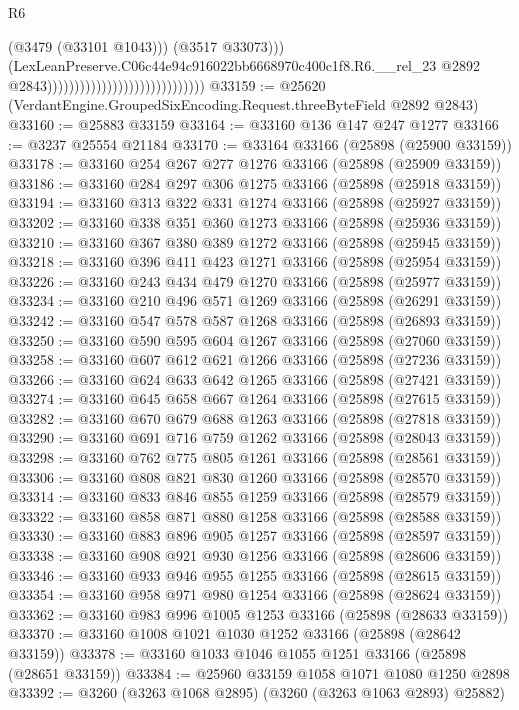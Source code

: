 \begin{lexlean}{R6}
\begin{coremodule}
                                                                  (@3479 (@33101 @1043)))
                                                                (@3517 @33073)))
                                                            (LexLeanPreserve.C06c44e94c916022bb6668970c400c1f8.R6.__rel_23
                                                              @2892
                                                              @2843)))))))))))))))))))))))))))))
@33159 := @25620 (VerdantEngine.GroupedSixEncoding.Request.threeByteField @2892 @2843)
@33160 := @25883 @33159
@33164 := @33160 @136 @147 @247 @1277
@33166 := @3237 @25554 @21184
@33170 := @33164 @33166 (@25898 (@25900 @33159))
@33178 := @33160 @254 @267 @277 @1276 @33166 (@25898 (@25909 @33159))
@33186 := @33160 @284 @297 @306 @1275 @33166 (@25898 (@25918 @33159))
@33194 := @33160 @313 @322 @331 @1274 @33166 (@25898 (@25927 @33159))
@33202 := @33160 @338 @351 @360 @1273 @33166 (@25898 (@25936 @33159))
@33210 := @33160 @367 @380 @389 @1272 @33166 (@25898 (@25945 @33159))
@33218 := @33160 @396 @411 @423 @1271 @33166 (@25898 (@25954 @33159))
@33226 := @33160 @243 @434 @479 @1270 @33166 (@25898 (@25977 @33159))
@33234 := @33160 @210 @496 @571 @1269 @33166 (@25898 (@26291 @33159))
@33242 := @33160 @547 @578 @587 @1268 @33166 (@25898 (@26893 @33159))
@33250 := @33160 @590 @595 @604 @1267 @33166 (@25898 (@27060 @33159))
@33258 := @33160 @607 @612 @621 @1266 @33166 (@25898 (@27236 @33159))
@33266 := @33160 @624 @633 @642 @1265 @33166 (@25898 (@27421 @33159))
@33274 := @33160 @645 @658 @667 @1264 @33166 (@25898 (@27615 @33159))
@33282 := @33160 @670 @679 @688 @1263 @33166 (@25898 (@27818 @33159))
@33290 := @33160 @691 @716 @759 @1262 @33166 (@25898 (@28043 @33159))
@33298 := @33160 @762 @775 @805 @1261 @33166 (@25898 (@28561 @33159))
@33306 := @33160 @808 @821 @830 @1260 @33166 (@25898 (@28570 @33159))
@33314 := @33160 @833 @846 @855 @1259 @33166 (@25898 (@28579 @33159))
@33322 := @33160 @858 @871 @880 @1258 @33166 (@25898 (@28588 @33159))
@33330 := @33160 @883 @896 @905 @1257 @33166 (@25898 (@28597 @33159))
@33338 := @33160 @908 @921 @930 @1256 @33166 (@25898 (@28606 @33159))
@33346 := @33160 @933 @946 @955 @1255 @33166 (@25898 (@28615 @33159))
@33354 := @33160 @958 @971 @980 @1254 @33166 (@25898 (@28624 @33159))
@33362 := @33160 @983 @996 @1005 @1253 @33166 (@25898 (@28633 @33159))
@33370 := @33160 @1008 @1021 @1030 @1252 @33166 (@25898 (@28642 @33159))
@33378 := @33160 @1033 @1046 @1055 @1251 @33166 (@25898 (@28651 @33159))
@33384 := @25960 @33159 @1058 @1071 @1080 @1250 @2898
@33392 := @3260 (@3263 @1068 @2895) (@3260 (@3263 @1063 @2893) @25882)

\end{coremodule}
\end{lexlean}
